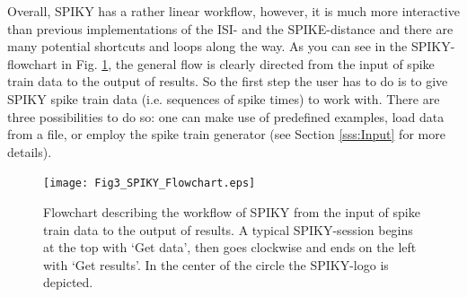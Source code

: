 \documentclass[10pt,twocolumn]{elsart5p}
\begin{document}
Overall, SPIKY has a rather linear workflow, however, it is much more interactive than previous implementations of the ISI- and the SPIKE-distance and there are many potential shortcuts and loops along the way. As you can see in the SPIKY-flowchart in Fig. \ref{fig:Fig3-SPIKY-Flowchart}, the general flow is clearly directed from the input of spike train data to the output of results. So the first step the user has to do is to give SPIKY spike train data (i.e. sequences of spike times) to work with. There are three possibilities to do so: one can make use of predefined examples, load data from a file, or employ the spike train generator (see Section \ref{sss:Input} for more details).
%
%
\begin{figure}
    \texttt{[image: Fig3\_SPIKY\_Flowchart.eps]}
    \caption{\abb\label{fig:Fig3-SPIKY-Flowchart} Flowchart describing the workflow of SPIKY from 	the input of spike train data to the output of results. A typical SPIKY-session begins at the top with `Get data', then goes clockwise and ends on the left with `Get results'. In the center of the circle the SPIKY-logo is depicted.}
\end{figure}
%
\end{document}
